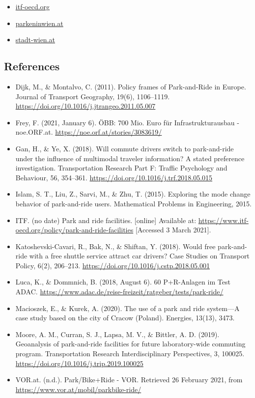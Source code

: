 \documentclass[
]{book}
\providecommand{\tightlist}{%
  \setlength{\itemsep}{0pt}\setlength{\parskip}{0pt}}
\begin{document}
\begin{itemize}
\tightlist
\item
  \href{https://www.itf-oecd.org/policy/park-and-ride-facilities}{itf-oecd.org}
\item
  \href{http://www.parkeninwien.at/en/Park-and-Ride.html}{parkeninwien.at}
\item
  \href{https://www.stadt-wien.at/wien/parken-in-wien/park-ride-parkhaeuser-im-ueberblick.html}{stadt-wien.at}
\end{itemize}

\hypertarget{references-15}{%
\subsection*{References}\label{references-15}}

\begin{itemize}
\tightlist
\item
  Dijk, M., \& Montalvo, C. (2011). Policy frames of Park-and-Ride in Europe. Journal of Transport Geography, 19(6), 1106--1119. \url{https://doi.org/10.1016/j.jtrangeo.2011.05.007}
\item
  Frey, F. (2021, January 6). ÖBB: 700 Mio. Euro für Infrastrukturausbau - noe.ORF.at. \url{https://noe.orf.at/stories/3083619/}
\item
  Gan, H., \& Ye, X. (2018). Will commute drivers switch to park-and-ride under the influence of multimodal traveler information? A stated preference investigation. Transportation Research Part F: Traffic Psychology and Behaviour, 56, 354--361. \url{https://doi.org/10.1016/j.trf.2018.05.015}
\item
  Islam, S. T., Liu, Z., Sarvi, M., \& Zhu, T. (2015). Exploring the mode change behavior of park-and-ride users. Mathematical Problems in Engineering, 2015.
\item
  ITF. (no date) Park and ride facilities. {[}online{]} Available at: \url{https://www.itf-oecd.org/policy/park-and-ride-facilities} {[}Accessed 3 March 2021{]}.
\item
  Katoshevski-Cavari, R., Bak, N., \& Shiftan, Y. (2018). Would free park-and-ride with a free shuttle service attract car drivers? Case Studies on Transport Policy, 6(2), 206--213. \url{https://doi.org/10.1016/j.cstp.2018.05.001}
\item
  Luca, K., \& Dommnich, B. (2018, August 6). 60 P+R-Anlagen im Test \textbar{} ADAC. \url{https://www.adac.de/reise-freizeit/ratgeber/tests/park-ride/}
\item
  Macioszek, E., \& Kurek, A. (2020). The use of a park and ride system---A case study based on the city of Cracow (Poland). Energies, 13(13), 3473.
\item
  Moore, A. M., Curran, S. J., Lapsa, M. V., \& Bittler, A. D. (2019). Geoanalysis of park-and-ride facilities for future laboratory-wide commuting program. Transportation Research Interdisciplinary Perspectives, 3, 100025. \url{https://doi.org/10.1016/j.trip.2019.100025}
\item
  VOR.at. (n.d.). Park/Bike+Ride - VOR. Retrieved 26 February 2021, from \url{https://www.vor.at/mobil/parkbike-ride/}
\end{itemize}
\end{document}
